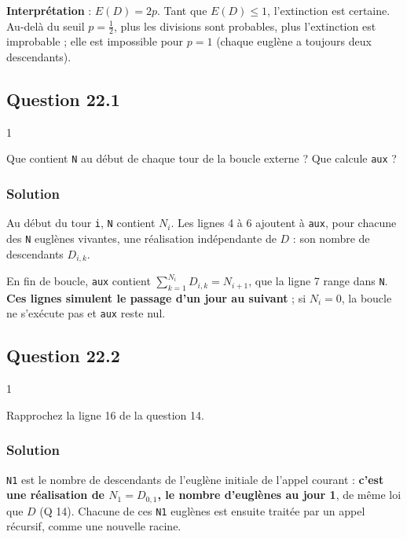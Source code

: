 \documentclass[11pt,a4paper]{article}
\begin{document}
\textbf{Interprétation} : \(E(D)=2p\). Tant que \(E(D)\le1\), l'extinction est certaine. Au-delà du seuil \(p=\frac12\), plus les divisions sont probables, plus l'extinction est improbable ; elle est impossible pour \(p=1\) (chaque euglène a toujours deux descendants).

\hypertarget{question-22.1}{%
\subsection{Question 22.1}\label{question-22.1}}

\begin{indication}{1}

Que contient \texttt{N} au début de chaque tour de la boucle externe ? Que calcule \texttt{aux} ?

\end{indication}

\hypertarget{solution-44}{%
\subsubsection{Solution}\label{solution-44}}

Au début du tour \texttt{i}, \texttt{N} contient \(N_i\). Les lignes 4 à 6 ajoutent à \texttt{aux}, pour chacune des \texttt{N} euglènes vivantes, une réalisation indépendante de \(D\) : son nombre de descendants \(D_{i,k}\).

En fin de boucle, \texttt{aux} contient \(\sum_{k=1}^{N_i}D_{i,k}=N_{i+1}\), que la ligne 7 range dans \texttt{N}. \textbf{Ces lignes simulent le passage d'un jour au suivant} ; si \(N_i=0\), la boucle ne s'exécute pas et \texttt{aux} reste nul.

\hypertarget{question-22.2}{%
\subsection{Question 22.2}\label{question-22.2}}

\begin{indication}{1}

Rapprochez la ligne 16 de la question 14.

\end{indication}

\hypertarget{solution-45}{%
\subsubsection{Solution}\label{solution-45}}

\texttt{N1} est le nombre de descendants de l'euglène initiale de l'appel courant : \textbf{c'est une réalisation de \(N_1=D_{0,1}\), le nombre d'euglènes au jour 1}, de même loi que \(D\) (Q 14). Chacune de ces \texttt{N1} euglènes est ensuite traitée par un appel récursif, comme une nouvelle racine.
\end{document}

